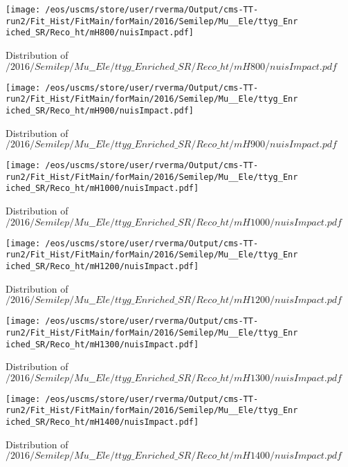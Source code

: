 \begin{figure}
\centering
\texttt{[image: /eos/uscms/store/user/rverma/Output/cms-TT-run2/Fit\_Hist/FitMain/forMain/2016/Semilep/Mu\_\_Ele/ttyg\_Enriched\_SR/Reco\_ht/mH800/nuisImpact.pdf]}
\caption{Distribution of $/2016/Semilep/Mu\_\_Ele/ttyg\_Enriched\_SR/Reco\_ht/mH800/nuisImpact.pdf$}
\end{figure}

\begin{figure}
\centering
\texttt{[image: /eos/uscms/store/user/rverma/Output/cms-TT-run2/Fit\_Hist/FitMain/forMain/2016/Semilep/Mu\_\_Ele/ttyg\_Enriched\_SR/Reco\_ht/mH900/nuisImpact.pdf]}
\caption{Distribution of $/2016/Semilep/Mu\_\_Ele/ttyg\_Enriched\_SR/Reco\_ht/mH900/nuisImpact.pdf$}
\end{figure}

\begin{figure}
\centering
\texttt{[image: /eos/uscms/store/user/rverma/Output/cms-TT-run2/Fit\_Hist/FitMain/forMain/2016/Semilep/Mu\_\_Ele/ttyg\_Enriched\_SR/Reco\_ht/mH1000/nuisImpact.pdf]}
\caption{Distribution of $/2016/Semilep/Mu\_\_Ele/ttyg\_Enriched\_SR/Reco\_ht/mH1000/nuisImpact.pdf$}
\end{figure}

\begin{figure}
\centering
\texttt{[image: /eos/uscms/store/user/rverma/Output/cms-TT-run2/Fit\_Hist/FitMain/forMain/2016/Semilep/Mu\_\_Ele/ttyg\_Enriched\_SR/Reco\_ht/mH1200/nuisImpact.pdf]}
\caption{Distribution of $/2016/Semilep/Mu\_\_Ele/ttyg\_Enriched\_SR/Reco\_ht/mH1200/nuisImpact.pdf$}
\end{figure}

\begin{figure}
\centering
\texttt{[image: /eos/uscms/store/user/rverma/Output/cms-TT-run2/Fit\_Hist/FitMain/forMain/2016/Semilep/Mu\_\_Ele/ttyg\_Enriched\_SR/Reco\_ht/mH1300/nuisImpact.pdf]}
\caption{Distribution of $/2016/Semilep/Mu\_\_Ele/ttyg\_Enriched\_SR/Reco\_ht/mH1300/nuisImpact.pdf$}
\end{figure}

\begin{figure}
\centering
\texttt{[image: /eos/uscms/store/user/rverma/Output/cms-TT-run2/Fit\_Hist/FitMain/forMain/2016/Semilep/Mu\_\_Ele/ttyg\_Enriched\_SR/Reco\_ht/mH1400/nuisImpact.pdf]}
\caption{Distribution of $/2016/Semilep/Mu\_\_Ele/ttyg\_Enriched\_SR/Reco\_ht/mH1400/nuisImpact.pdf$}
\end{figure}

